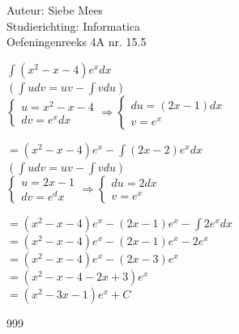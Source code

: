 \documentclass[a4paper]{article}
\begin{document}
  
\noindent \large Auteur: Siebe Mees \\
\noindent \large Studierichting: Informatica\\
\noindent \large Oefeningenreeks 4A nr. 15.5\\

\medskip

\normalsize

$\displaystyle\int (x^2-x-4) e^x dx $\\

$ \left( \displaystyle\int u dv = uv - \displaystyle\int vdu \right) $\\

$\left\{
   \begin{array}{l}
       u = x^2-x-4\\
       dv = e^xdx
   \end{array}
\right.
\Rightarrow
\left\{
   \begin{array}{l}
       du = (2x-1)dx \\
       v = e^x
   \end{array}
\right.$

$ = (x^2-x-4)e^x - \displaystyle\int (2x-2)e^x dx $\\

$ \left( \displaystyle\int u dv = uv - \displaystyle\int vdu \right) $\\

$\left\{
   \begin{array}{l}
       u = 2x-1\\
       dv = e^dx
   \end{array}
\right.
\Rightarrow
\left\{
   \begin{array}{l}
       du = 2dx \\
       v = e^x
   \end{array}
\right.$

$ = (x^2-x-4)e^x - (2x-1)e^x - \displaystyle\int 2e^x dx $\\

$ = (x^2-x-4)e^x - (2x-1)e^x - 2e^x $ \\

$ = (x^2-x-4)e^x - (2x-3)e^x $ \\

$ = (x^2-x-4 - 2x+3)e^x $ \\

$ = (x^2-3x -1)e^x + C $ \\


\begin{thebibliography}{999}
\end{thebibliography}
\end{document}
